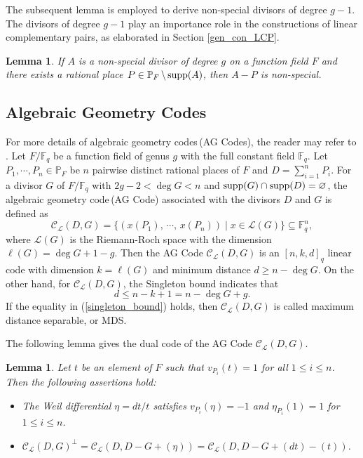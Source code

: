 \documentclass[journal,12pt,onecolumn]{IEEEtran}
\newtheorem{lemma}[theorem]{Lemma}
\begin{document}
The subsequent lemma is employed to derive non-special divisors of degree $g-1$. The divisors of degree $g-1$ play an importance role in the constructions of linear complementary pairs, as elaborated in Section \ref{gen_con_LCP}.

\begin{lemma}\cite[Lem. 3]{BALLET2006293}\label{non_special_g-1}
    If $A$ is a non-special divisor of degree $g$ on a function field $F$ and there exists a rational place $P\in\mathbb{P}_F\,\backslash\,{\rm supp}(A)$, then $A-P$ is non-special. 
\end{lemma}



\subsection{Algebraic Geometry Codes}
For more details of algebraic geometry codes\,(AG Codes), the reader may refer to \cite{Algebraic-Geometric_Codes}. Let $F/\mathbb{F}_q$ be a function field of genus $g$ with the full constant field $\mathbb{F}_q$. Let $P_1,\cdots,P_n\in\mathbb{P}_F$ be $n$ pairwise distinct rational places of $F$ and $D=\sum_{i=1}^nP_i$. For a divisor $G$ of $F/\mathbb{F}_q$ with $2g-2<\deg G<n$ and ${\rm{supp}}(G)\cap {\rm{supp}}(D)=\varnothing$, the algebraic geometry code\,(AG Code) associated with the divisors $D$ and $G$ is defined as
\[
    \mathcal{C}_{\mathcal{L}}(D,G)=\{(x(P_1),\,\cdots,\,x(P_n))\mid x\in\mathcal{L}(G)\}\subseteq\mathbb{F}_q^n,
\]
where $\mathcal{L}(G)$ is the Riemann-Roch space with the dimension $\ell(G)=\deg G+1-g$. Then the AG Code $\mathcal{C}_{\mathcal{L}}(D,G)$ is an $[n,k,d]_q$ linear code with dimension $k=\ell(G)$ and minimum distance $d\ge n-\deg G$. On the other hand, for $\mathcal{C}_{\mathcal{L}}(D,G)$, the Singleton bound indicates that 
\begin{equation}\label{singleton_bound}
    d\le n-k+1=n-\deg G+g. 
\end{equation}
If the equality in (\ref{singleton_bound}) holds, then $\mathcal{C}_{\mathcal{L}}(D,G)$ is called maximum distance separable, or MDS. 

The following lemma gives the dual code of the AG Code $\mathcal{C}_{\mathcal{L}}(D,G)$. 
\begin{lemma}\cite[Prop. 2.2.10 and Prop. 8.1.2]{Algebraic_Function_Fields_and_Codes}\label{dual_AG Code}
    Let $t$ be an element of $F$ such that $v_{P_i}(t)=1$ for all $1\le i\le n$. Then the following assertions hold:
    \begin{itemize}
        \item The Weil differential $\eta=dt/t$ satisfies $v_{P_i}(\eta)=-1$ and $\eta_{P_i}(1)=1$ for $1\le i\le n$. 
        \item $\mathcal{C}_{\mathcal{L}}(D,G)^{\bot}=\mathcal{C}_{\mathcal{L}}(D,D-G+(\eta))=\mathcal{C}_{\mathcal{L}}(D,D-G+(dt)-(t))$. 
    \end{itemize}
\end{lemma}
\end{document}
